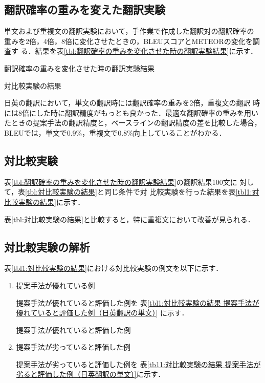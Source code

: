 \documentclass[japanese]{jnlp_1.4}
\begin{document}
\subsection{翻訳確率の重みを変えた翻訳実験}

単文および重複文の翻訳実験において，手作業で作成した翻訳対の翻訳確率の
重みを2倍，4倍，8倍に変化させたときの，BLEUスコアとMETEORの変化を調査す
る．結果を表\ref{tbl:翻訳確率の重みを変化させた時の翻訳実験結果}に示す．

\begin{table}[b]
\caption{翻訳確率の重みを変化させた時の翻訳実験結果}
\label{tbl:翻訳確率の重みを変化させた時の翻訳実験結果}

\end{table}
\begin{table}[b]
\caption{対比較実験の結果}
\label{tbl1:対比較実験の結果}

\end{table}



日英の翻訳において，単文の翻訳時には翻訳確率の重みを2倍，重複文の翻訳
時には8倍にした時に翻訳精度がもっとも良かった．最適な翻訳確率の重みを用い
たときの提案手法の翻訳精度と，ベースラインの翻訳精度の差を比較した場合，
BLEUでは，単文で0.9\%，重複文で0.8\%向上していることがわかる．


\subsection{対比較実験}
\label{sec1:対比較実験}

表\ref{tbl:翻訳確率の重みを変化させた時の翻訳実験結果}の翻訳結果100文に
対して，表\ref{tbl:対比較実験の結果}と同じ条件で対
比較実験を行った結果を表\ref{tbl1:対比較実験の結果}に示す．

表\ref{tbl:対比較実験の結果}と比較すると，特に重複文において改善が見られる．

\subsection{対比較実験の解析}

表\ref{tbl1:対比較実験の結果}における対比較実験の例文を以下に示す．

\begin{enumerate}

\item{提案手法が優れている例}

提案手法が優れていると評価した例を
表\ref{tbl1:対比較実験の結果 提案手法が優れていると評価した例（日英翻訳の単文）}
に示す．


\begin{table}[b]
\caption{提案手法が優れていると評価した例}
\label{tbl1:対比較実験の結果 提案手法が優れていると評価した例（日英翻訳の単文）}

\end{table}



\item{提案手法が劣っていると評価した例}

提案手法が劣っていると評価した例を
表\ref{tb11:対比較実験の結果 提案手法が劣ると評価した例（日英翻訳の単文）}に示す．


\end{enumerate}
\end{document}
